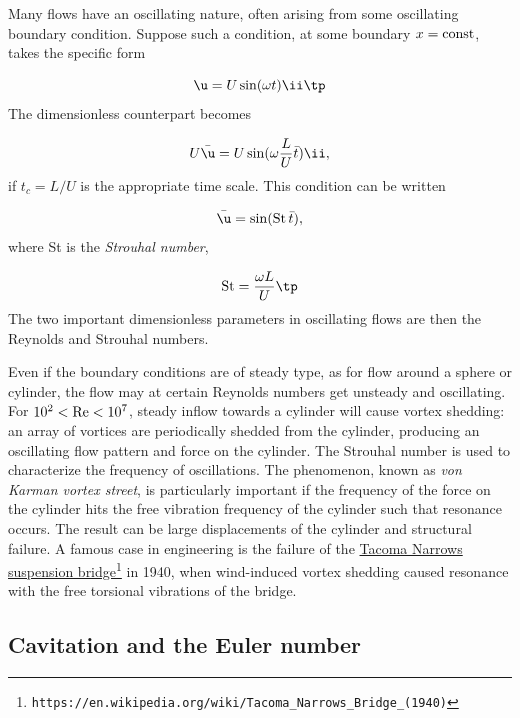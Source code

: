 \documentclass[graybox,envcountchap,sectrefs,final]{svmonodo}
\begin{document}

Many flows have an oscillating nature, often arising from some
oscillating boundary condition. Suppose such a condition, at some
boundary $x=\hbox{const}$, takes the specific form

\[ \u = U\sin(\omega t)\ii\tp\]
The dimensionless counterpart becomes

\[ U\bar\u = U\sin(\omega \frac{L}{U}\bar t)\ii,\]
if $t_c=L/U$ is the appropriate time scale. This condition can be
written

\begin{equation}
\bar\u = \sin(\hbox{St}\,\bar t),
\end{equation}
where St is the \emph{Strouhal number},

\begin{equation}
\hbox{St} = \frac{\omega L}{U}\tp
\end{equation}
The two important dimensionless parameters in oscillating flows are
then the Reynolds and Strouhal numbers.


Even if the boundary conditions
are of steady type, as for flow around a sphere or cylinder,
the flow may at certain Reynolds numbers get unsteady and oscillating.
For $10^2 < \hbox{Re} < 10^7$, steady inflow towards a cylinder will
cause vortex shedding: an array of vortices are periodically shedded
from the cylinder, producing an oscillating flow pattern and force
on the cylinder. The Strouhal number is used to characterize the
frequency of oscillations. The phenomenon, known as \emph{von Karman
vortex street}, is particularly important if the frequency
of the force on the cylinder hits the free vibration frequency
of the cylinder such that resonance occurs. The result can be large
displacements of the cylinder and structural failure. A famous
case in engineering is the failure of the \href{{https://en.wikipedia.org/wiki/Tacoma_Narrows_Bridge_(1940)}}{Tacoma Narrows suspension
bridge}\footnote{\texttt{https://en.wikipedia.org/wiki/Tacoma\_Narrows\_Bridge\_(1940)}}
in 1940, when wind-induced vortex shedding caused resonance
with the free torsional vibrations of the bridge.


\subsection{Cavitation and the Euler number}
\end{document}
